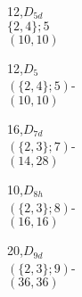 \documentclass{beamer}
\begin{document}
\begin{frame}
\begin{center}
\small
\begin{minipage}[b]{1.6cm}
\centering
{}\par
12,$D_{5d}$\\ 
 $\{2,4\};5$\\
$(10,10)$
\end{minipage}
\begin{minipage}[b]{1.6cm}
\centering
{}\par
12,$D_{5}$\\
 $(\{2,4\};5)$-\\
$(10,10)$
\end{minipage}
\begin{minipage}[b]{1.6cm}
\centering
{}\par
16,$D_{7d}$\\
 $(\{2,3\};7)$-\\
$(14,28)$
\end{minipage}
\begin{minipage}[b]{1.6cm}
\centering
{}\par
10,$D_{8h}$\\
 $(\{2,3\};8)$-\\
$(16,16)$
\end{minipage}
\begin{minipage}[b]{1.6cm}
\centering
{}\par
20,$D_{9d}$\\
$(\{2,3\};9)$-\\
$(36,36)$
\end{minipage}
 \end{center}




\end{frame}
\end{document}
